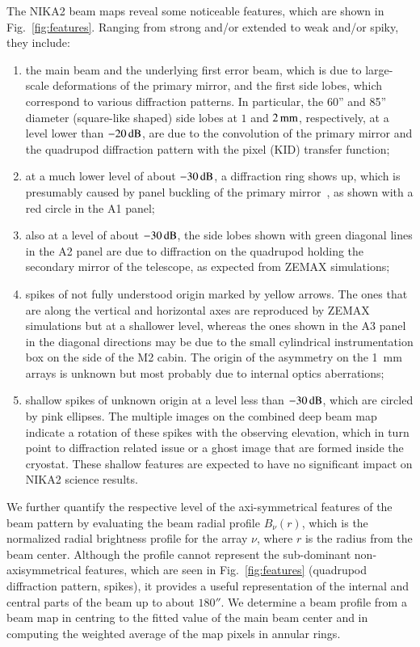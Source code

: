 \documentclass[traditionalabstract]{aa}
\newcommand{\lp}[1]{#1}
\begin{document}
The NIKA2 beam maps reveal some noticeable features, which are
shown in Fig.~\ref{fig:features}. Ranging from strong and/or extended to
weak and/or spiky, they include:
\begin{enumerate}
\item the main beam and the underlying first error
  beam, which is due to large-scale deformations of the primary
  mirror, and the first side lobes, {\lp which correspond to various diffraction
  patterns. In particular, the 60'' and 85'' diameter (square-like shaped) side
  lobes at $1$ and $2\,\rm{mm}$, respectively, at a level lower than
  $-20\,\rm{dB}$, are due to the convolution of the primary mirror and the
  quadrupod diffraction pattern with the pixel (KID) transfer function;}
\item at a much lower level of about $-30\,\rm{dB}$, a diffraction ring shows    
up, which is presumably caused by panel buckling of the primary 
  mirror~\citep{Greve2010}, as shown with a red circle in the A1 panel;
\item also at a level of about $-30\,\rm{dB}$, the side lobes shown with green
  diagonal lines in the A2 panel are due to diffraction on the
  quadrupod holding the secondary mirror of the telescope, as expected
  from ZEMAX simulations;  
\item spikes of not fully understood origin marked by yellow
  arrows. The ones that are along the vertical and
  horizontal axes are reproduced by ZEMAX simulations but at a 
  shallower level, whereas the ones shown in the A3 panel in the
  diagonal directions may be due to the small cylindrical
  instrumentation box on the side of the M2 cabin. The origin of the
  asymmetry on the 1~mm arrays is unknown but most probably due to
  internal optics aberrations;
\item shallow spikes of unknown origin at a level less than $-30\,\rm{dB}$, which are circled by pink
  ellipses. The multiple images on the combined deep beam map indicate
  a rotation of these spikes with the observing elevation, which in
  turn point to diffraction related issue or a ghost image that are
  formed inside the cryostat. These shallow features are expected to
  have no significant impact on NIKA2 science results.
\end{enumerate}

We further quantify the respective level of the axi-symmetrical
features of the beam pattern by evaluating the beam radial profile
$B_\nu(r)$, which is the normalized radial brightness profile for the
array $\nu$, where $r$ is the radius from the beam center.
Although the profile cannot represent the sub-dominant non-axisymmetrical
features, which are seen in Fig.~\ref{fig:features} (quadrupod
diffraction pattern, spikes), it provides a useful
representation of the internal and central parts of the beam {\lp up to
 about $180''$.} We determine a beam profile from a beam map in centring to
the fitted value of the main beam center and in computing the
weighted average of the map pixels in annular rings.
\end{document}
